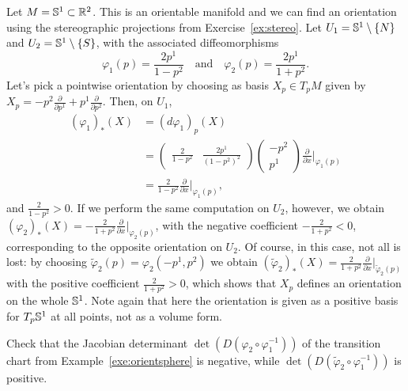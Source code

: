 \begin{example}\label{exe:orientsphere}
	Let $M = \mathbb{S}^1\subset \mathbb{R}^2$.
	This is an orientable manifold and we can find an orientation using the stereographic projections from Exercise~\ref{ex:stereo}.
	Let $U_1 = \mathbb{S}^1\setminus\{N\}$ and $U_2 = \mathbb{S}^1\setminus\{S\}$, with the associated diffeomorphisms
	\begin{equation}
		\varphi_1(p) = \frac{2p^1}{1-p^2}
		\quad\mbox{and}\quad
		\varphi_2(p) = \frac{2p^1}{1+p^2}.
	\end{equation}
	Let's pick a pointwise orientation by choosing as basis $X_p\in T_pM$ given by $X_p = -p^2 \frac{\partial}{\partial p^1} + p^1 \frac{\partial}{\partial p^2}$.
	Then, on $U_1$,
	\begin{align}
		(\varphi_1)_*(X) & = (d\varphi_1)_p(X)                                                \\
		                 & = \left(\begin{smallmatrix}
				                           \frac{2}{1-p^2} & \frac{2p^1}{(1-p^2)^2}
			                           \end{smallmatrix}\right)
		\left(\begin{smallmatrix}
				      -p^2 \\ p^1
			      \end{smallmatrix}\right) \frac{\partial}{\partial x}\Big|_{\varphi_1(p)}        \\
		                 & = \frac{2}{1-p^2} \frac{\partial}{\partial x}\Big|_{\varphi_1(p)},
	\end{align}
	and $\frac{2}{1-p^2}>0$.
	If we perform the same computation on $U_2$, however, we obtain $(\varphi_2)_*(X) = -\frac{2}{1+p^2}\frac{\partial}{\partial x}\Big|_{\varphi_2(p)}$, with the negative coefficient $-\frac{2}{1+p^2} < 0$, corresponding to the opposite orientation on $U_2$.
	Of course, in this case, not all is lost: by choosing $\widetilde\varphi_2(p) = \varphi_2(-p^1, p^2)$ we obtain $(\widetilde\varphi_2)_*(X) = \frac{2}{1+p^2} \frac{\partial}{\partial x}\Big|_{\widetilde\varphi_2(p)}$ with the positive coefficient $\frac{2}{1+p^2} > 0$, which shows that $X_p$ defines an orientation on the whole $\mathbb{S}^1$.
	Note again that here the orientation is given as a positive basis for $T_p \mathbb{S}^1$ at all points, not as a volume form.
\end{example}

\begin{exercise}
	Check that the Jacobian determinant $\det(D(\varphi_2\circ \varphi_1^{-1}))$ of the transition chart from Example~\ref{exe:orientsphere} is negative, while $\det(D(\widetilde\varphi_2\circ \varphi_1^{-1}))$ is positive.
\end{exercise}

